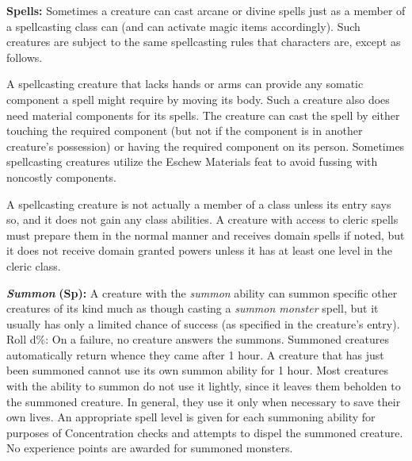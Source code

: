 \documentclass{article}
\begin{document}
\vspace{12pt}
\textbf{Spells:} Sometimes a creature can cast arcane or divine spells just as 
a member of a spellcasting class can (and can activate magic items accordingly). 
Such creatures are subject to the same spellcasting rules that characters are, 
except as follows. 

A spellcasting creature that lacks hands or arms can provide any somatic component 
a spell might require by moving its body. Such a creature also does need material 
components for its spells. The creature can cast the spell by either touching the 
required component (but not if the component is in another creature's possession) 
or having the required component on its person. Sometimes spellcasting creatures 
utilize the Eschew Materials feat to avoid fussing with noncostly components.

A spellcasting creature is not actually a member of a class unless its entry says 
so, and it does not gain any class abilities. A creature with access to cleric 
spells must prepare them in the normal manner and receives domain spells if noted, 
but it does not receive domain granted powers unless it has at least one level 
in the cleric class.

\vspace{12pt}
\textit{\textbf{Summon }}\textbf{(Sp):} A creature with the \textit{summon }ability 
can summon specific other creatures of its kind much as though casting a \textit{summon 
monster }spell, but it usually has only a limited chance of success (as specified 
in the creature's entry). Roll d\%: On a failure, no creature answers the summons. 
Summoned creatures automatically return whence they came after 1 hour. A creature 
that has just been summoned cannot use its own summon ability for 1 hour. Most 
creatures with the ability to summon do not use it lightly, since it leaves them 
beholden to the summoned creature. In general, they use it only when necessary 
to save their own lives. An appropriate spell level is given for each summoning 
ability for purposes of Concentration checks and attempts to dispel the summoned 
creature. No experience points are awarded for summoned monsters.
\end{document}
